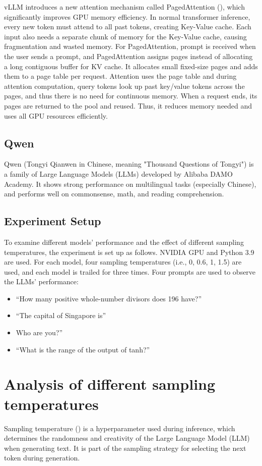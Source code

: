 \documentclass{article} %
\begin{document}
vLLM introduces a new attention mechanism called PagedAttention (\cite{vllm2023}), which significantly improves GPU memory efficiency. In normal transformer inference, every new token must attend to all past tokens, creating Key-Value cache. Each input also needs a separate chunk of memory for the Key-Value cache, causing fragmentation and wasted memory. For PagedAttention, prompt is received when the user sends a prompt, and PagedAttention assigns pages instead of allocating a long contiguous buffer for KV cache. It allocates small fixed-size pages and adds them to a page table per request. Attention uses the page table and during attention computation, query tokens look up past key/value tokens across the pages, and thus there is no need for continuous memory. When a request ends, its pages are returned to the pool and reused. Thus, it reduces memory needed and uses all GPU resources efficiently.

\subsection{Qwen}
Qwen (Tongyi Qianwen in Chinese, meaning "Thousand Questions of Tongyi") is a family of Large Language Models (LLMs) developed by Alibaba DAMO Academy. It shows strong performance on multilingual tasks (especially Chinese), and performs well on commonsense, math, and reading comprehension.

\subsection{Experiment Setup}
To examine different models' performance and the effect of different sampling temperatures, the experiment is set up as follows. NVIDIA GPU and Python 3.9 are used. For each model, four sampling temperatures (i.e., 0, 0.6, 1, 1.5) are used, and each model is trailed for three times. Four prompts are used to observe the LLMs' performance:
\begin{itemize}
    \item “How many positive whole-number divisors does 196 have?”
    \item “The capital of Singapore is”
    \item Who are you?”
    \item “What is the range of the output of tanh?”
\end{itemize}


\section{Analysis of different sampling temperatures}
Sampling temperature (\cite{holtzman2019curious}) is a hyperparameter used during inference, which determines the randomness and creativity of the Large Language Model (LLM) when generating text. It is part of the sampling strategy for selecting the next token during generation.
\end{document}
